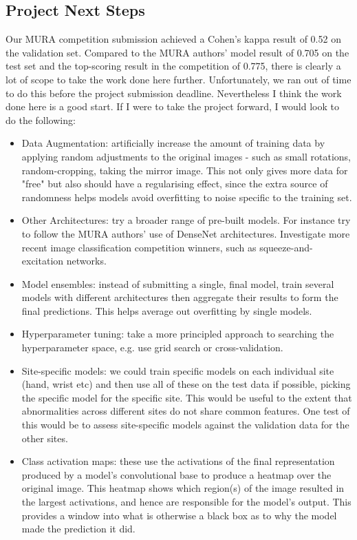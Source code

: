\documentclass[11pt]{article} %
\theoremstyle{plain}
\theoremstyle{definition}
\begin{document}
\subsection{Project Next Steps}
Our MURA competition submission achieved a Cohen's kappa result of 0.52 on the validation set. Compared to the MURA authors' model result of 0.705 on the test set and the top-scoring result in the competition of 0.775, there is clearly a lot of scope to take the work done here further. Unfortunately, we ran out of time to do this before the project submission deadline. Nevertheless I think the work done here is a good start. If I were to take the project forward, I would look to do the following:
\begin{itemize}
\item Data Augmentation: artificially increase the amount of training data by applying random adjustments to the original images - such as small rotations, random-cropping, taking the mirror image. This not only gives more data for "free" but also should have a regularising effect, since the extra source of randomness helps models avoid overfitting to noise specific to the training set. 
\item Other Architectures: try a broader range of pre-built models. For instance try to follow the MURA authors' use of DenseNet architectures. Investigate more recent image classification competition winners, such as squeeze-and-excitation networks.
\item Model ensembles: instead of submitting a single, final model, train several models with different architectures then aggregate their results to form the final predictions. This helps average out overfitting by single models. 
\item Hyperparameter tuning: take a more principled approach to searching the hyperparameter space, e.g. use grid search or cross-validation.
\item Site-specific models: we could train specific models on each individual site (hand, wrist etc) and then use all of these on the test data if possible, picking the specific model for the specific site. This would be useful to the extent that abnormalities across different sites do not share common features. One test of this would be to assess site-specific models against the validation data for the other sites.  
\item Class activation maps: these use the activations of the final representation produced by a model's convolutional base to produce a heatmap over the original image. This heatmap shows which region(s) of the image resulted in the largest activations, and hence are responsible for the model's output. This provides a window into what is otherwise a black box as to why the model made the prediction it did.
\end{itemize}
\end{document}
